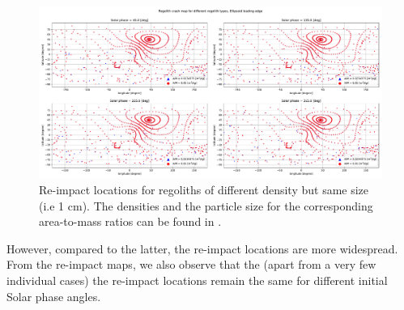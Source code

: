 \FloatBarrier
\begin{figure}[htb]
\centering
\captionsetup{justification=centering}
\includegraphics[angle=90, width=\textwidth, height=\textheight, keepaspectratio=true]{leading_edge_perturbations/crashMap_3P2_7P5_density_1cm_radius.pdf}
\caption{Re-impact locations for regoliths of different density but same size (i.e 1 cm). The densities and the particle size for the corresponding area-to-mass ratios can be found in .}
\label{fig:crashmap_3.2_7.5_density_1cmRadius_leadingEdge}
\end{figure}
\FloatBarrier
However, compared to the latter, the re-impact locations are more widespread. From the re-impact maps, we also observe that the (apart from a very few individual cases) the re-impact locations remain the same for different initial Solar phase angles.
%
\newline\newline
%
